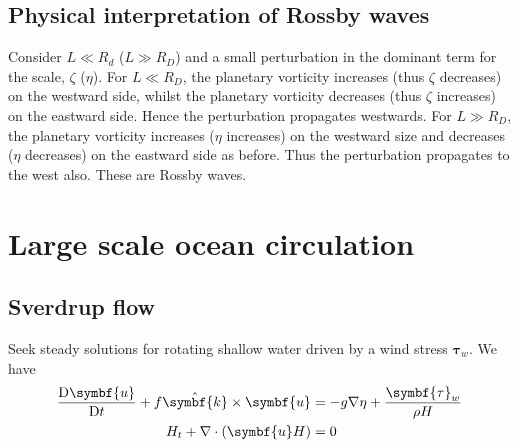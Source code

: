 \documentclass{jknotes}
\begin{document}
\subsection{Physical interpretation of Rossby waves}
Consider $L \ll R_d$ ($L \gg R_D$)  and a small perturbation in the dominant
term for the scale, $\zeta$ ($\eta$). For $L \ll R_D$, the planetary vorticity
increases (thus $\zeta$ decreases) on the westward side, whilst the planetary
vorticity decreases (thus $\zeta$ increases) on the eastward side. Hence the
perturbation propagates westwards. For $L \gg R_D$, the planetary vorticity
increases ($\eta$ increases) on the westward size and decreases ($\eta$
decreases) on the eastward side as before. Thus the perturbation propagates
to the west also. These are Rossby waves.
\begin{center}
	\qquad
\end{center}

\section{Large scale ocean circulation}
\subsection{Sverdrup flow}
Seek steady solutions for rotating shallow water driven by a wind stress
$\symbf{\tau}_w$. We have
\begin{align}
	\frac{\diffD \symbf{u}}{\diffD t} + f \hat{\symbf{k}}\times\symbf{u} &= -g \nabla \eta +
	\frac{\symbf{\tau}_w}{\rho H} \label{eq:lsoc1} \\
	H_t + \nabla \cdot (\symbf{u} H) &= 0 \label{eq:lsoc2}
\end{align}
\end{document}
